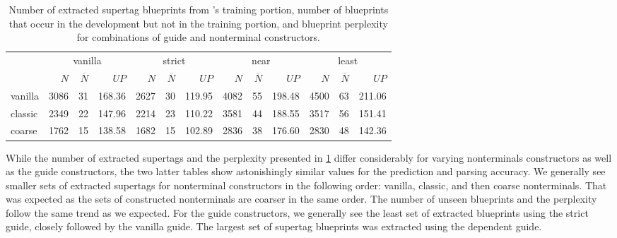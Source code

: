\documentclass[../../document.tex]{subfiles}
\begin{document}
    \begin{table}
        \caption{\label{tbl:gridsearch:1:1}
            Number of extracted supertag blueprints from \negra{}'s training portion, number of blueprints that occur in the development but not in the training portion, and blueprint perplexity for combinations of guide and nonterminal constructors.
        }
        \centering
        \setlength{\tabcolsep}{5pt}
        \vspace{.2cm}
        \begin{tabular}{l|rrr|rrr|rrr|rrr}
            \toprule
                        & \multicolumn{3}{c|}{vanilla} & \multicolumn{3}{c|}{strict} & \multicolumn{3}{c|}{near} & \multicolumn{3}{c}{least} \\
                        & $N$ & $\overline{N}$ & $\mathit{UP}$ & $N$ & $\overline{N}$ & $\mathit{UP}$ & $N$ & $\overline{N}$ & $\mathit{UP}$ & $N$ & $\overline{N}$ & $\mathit{UP}$ \\ \hline
            vanilla     & 3086 & 31 & 168.36 & 2627 & 30 & 119.95 & 4082 & 55 & 198.48 & 4500 & 63 & 211.06 \\
            classic     & 2349 & 22 & 147.96 & 2214 & 23 & 110.22 & 3581 & 44 & 188.55 & 3517 & 56 & 151.41 \\
            coarse      & 1762 & 15 & 138.58 & 1682 & 15 & 102.89 & 2836 & 38 & 176.60 & 2830 & 48 & 142.36 \\
            \bottomrule
        \end{tabular}
    \end{table}
    
    While the number of extracted supertags and the perplexity presented in \cref{tbl:gridsearch:1:1} differ considerably for varying nonterminals constructors as well as the guide constructors, the two latter tables show astonishingly similar values for the prediction and parsing accuracy.
    We generally see smaller sets of extracted supertags for nonterminal constructors in the following order: vanilla, classic, and then coarse nonterminals.
    That was expected as the sets of constructed nonterminals are coarser in the same order.
    The number of unseen blueprints and the perplexity follow the same trend as we expected.
    For the guide constructors, we generally see the least set of extracted blueprints using the strict guide,  closely followed by the vanilla guide.
    The largest set of supertag blueprints was extracted using the dependent guide.
    
\end{document}
